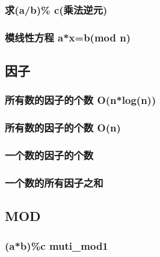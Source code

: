 \documentclass[a4paper]{article}
\begin{document}
\begin{CJK*}{UTF8}{gbsn}
\begin{multicols}{3}
\begin{flushleft}
\subsubsection{求(a/b)\% c(乘法逆元)}


\subsubsection{模线性方程 a*x=b(mod n)}



\subsection{因子}
\subsubsection{所有数的因子的个数 O(n*log(n))}



\subsubsection{所有数的因子的个数 O(n)}



\subsubsection{一个数的因子的个数}


\subsubsection{一个数的所有因子之和}


\subsection{MOD}

 
\subsubsection{(a*b)\%c  muti\_mod1}



\end{flushleft}
\end{multicols}
\end{CJK*}
\end{document}
